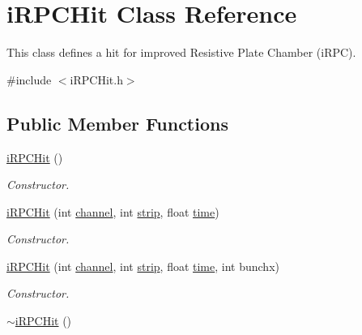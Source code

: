 \hypertarget{classiRPCHit}{\section{i\-R\-P\-C\-Hit Class Reference}
\label{classiRPCHit}
}


This class defines a hit for improved Resistive Plate Chamber (i\-R\-P\-C).  




{\ttfamily \#include $<$i\-R\-P\-C\-Hit.\-h$>$}

\subsection*{Public Member Functions}
\begin{DoxyCompactItemize}
\item 
\hypertarget{classiRPCHit_a89aa31b62457c84dbcf04a8b6d07d572}{\hyperlink{classiRPCHit_a89aa31b62457c84dbcf04a8b6d07d572}{i\-R\-P\-C\-Hit} ()}\label{classiRPCHit_a89aa31b62457c84dbcf04a8b6d07d572}

\begin{DoxyCompactList}\small\item\em Constructor. \end{DoxyCompactList}\item 
\hyperlink{classiRPCHit_ab92bcd09b430233e152f0e4ada34e919}{i\-R\-P\-C\-Hit} (int \hyperlink{classiRPCHit_a43474d73adf4e2a643bf04612e1ac33d}{channel}, int \hyperlink{classiRPCHit_a11730bd1b375b16e381ce08fee14609e}{strip}, float \hyperlink{classiRPCHit_ad57a1f96493e5144c03099481984260b}{time})
\begin{DoxyCompactList}\small\item\em Constructor. \end{DoxyCompactList}\item 
\hyperlink{classiRPCHit_a8ba2455ac077525379c5e321487fb53d}{i\-R\-P\-C\-Hit} (int \hyperlink{classiRPCHit_a43474d73adf4e2a643bf04612e1ac33d}{channel}, int \hyperlink{classiRPCHit_a11730bd1b375b16e381ce08fee14609e}{strip}, float \hyperlink{classiRPCHit_ad57a1f96493e5144c03099481984260b}{time}, int bunchx)
\begin{DoxyCompactList}\small\item\em Constructor. \end{DoxyCompactList}\item 
\hypertarget{classiRPCHit_a6cb341fee255542709e076ad864a1de9}{\hyperlink{classiRPCHit_a6cb341fee255542709e076ad864a1de9}{$\sim$i\-R\-P\-C\-Hit} ()}\label{classiRPCHit_a6cb341fee255542709e076ad864a1de9}


\end{DoxyCompactItemize}
